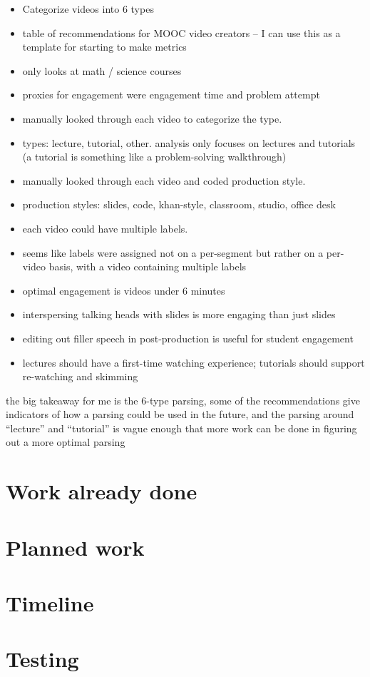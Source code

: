 \documentclass[12pt]{article}
\begin{document}
\begin{itemize}
\item Categorize videos into 6 types
\item table of recommendations for MOOC video creators -- I can use this as a template for starting to make metrics
\item only looks at math / science courses
\item proxies for engagement were engagement time and problem attempt
\item manually looked through each video to categorize the type.
\item types: lecture, tutorial, other. analysis only focuses on lectures and tutorials (a tutorial is something like a problem-solving walkthrough)
\item manually looked through each video and coded production style. 
\item production styles: slides, code, khan-style, classroom, studio, office desk
\item each video could have multiple labels. 
\item seems like labels were assigned not on a per-segment but rather on a per-video basis, with a video containing multiple labels
\item optimal engagement is videos under 6 minutes
\item interspersing talking heads with slides is more engaging than just slides
\item editing out filler speech in post-production is useful for student engagement
\item lectures should have a first-time watching experience; tutorials should support re-watching and skimming
\end{itemize}

\rightarrow the big takeaway for me is the 6-type parsing, some of the recommendations give indicators of how a parsing could be used in the future, and the parsing around ``lecture'' and ``tutorial'' is vague enough that more work can be done in figuring out a more optimal parsing

\section{Work already done}
\section{Planned work}
\section{Timeline}
\section{Testing}
\end{document}
